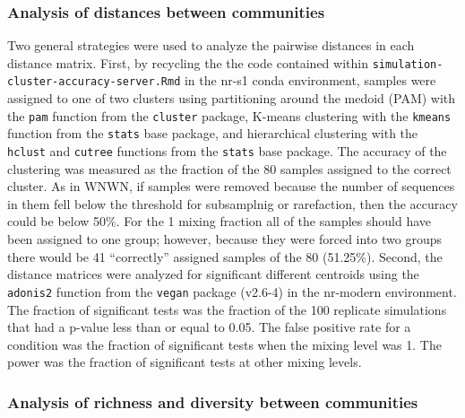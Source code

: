\documentclass[
]{article}
\begin{document}
\hypertarget{analysis-of-distances-between-communities}{%
\subsubsection{Analysis of distances between
communities}\label{analysis-of-distances-between-communities}}

Two general strategies were used to analyze the pairwise distances in
each distance matrix. First, by recycling the the code contained within
\texttt{simulation-cluster-accuracy-server.Rmd} in the nr-s1 conda
environment, samples were assigned to one of two clusters using
partitioning around the medoid (PAM) with the \texttt{pam} function from
the \texttt{cluster} package, K-means clustering with the
\texttt{kmeans} function from the \texttt{stats} base package, and
hierarchical clustering with the \texttt{hclust} and \texttt{cutree}
functions from the \texttt{stats} base package. The accuracy of the
clustering was measured as the fraction of the 80 samples assigned to
the correct cluster. As in WNWN, if samples were removed because the
number of sequences in them fell below the threshold for subsamplnig or
rarefaction, then the accuracy could be below 50\%. For the 1 mixing
fraction all of the samples should have been assigned to one group;
however, because they were forced into two groups there would be 41
``correctly'' assigned samples of the 80 (51.25\%). Second, the distance
matrices were analyzed for significant different centroids using the
\texttt{adonis2} function from the \texttt{vegan} package (v2.6-4) in
the nr-modern environment. The fraction of significant tests was the
fraction of the 100 replicate simulations that had a p-value less than
or equal to 0.05. The false positive rate for a condition was the
fraction of significant tests when the mixing level was 1. The power was
the fraction of significant tests at other mixing levels.

\hypertarget{analysis-of-richness-and-diversity-between-communities}{%
\subsubsection{Analysis of richness and diversity between
communities}\label{analysis-of-richness-and-diversity-between-communities}}
\end{document}
